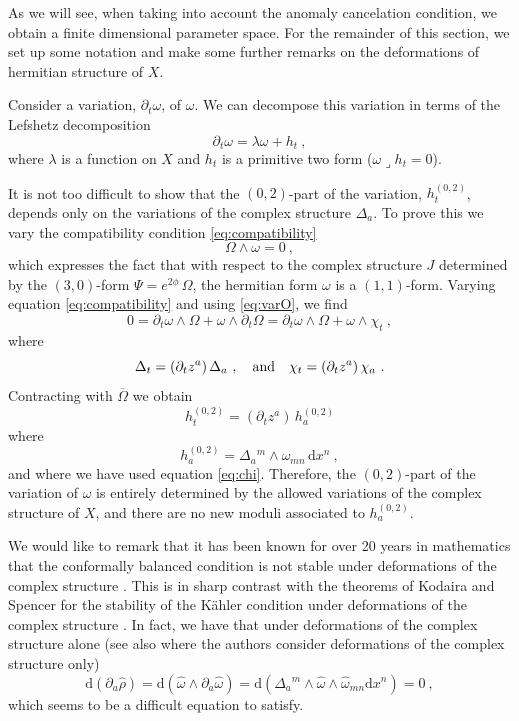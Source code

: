 \documentclass[12pt,a4paper]{article}
\def\bar#1{\overline{#1}}
\let\p=\partial
\def\d{\textrm{d}}
\theoremstyle{definition}
\begin{document}
As we will see,  when taking into account the anomaly cancelation condition, we obtain a finite dimensional parameter space. For the remainder of this section, we set up some notation and make some further remarks on the deformations of hermitian structure of $X$.

Consider a variation, $\p_t\omega$, of $\omega$.  We can decompose this variation in terms of the Lefshetz decomposition
\begin{equation}
 \p_t\omega = \lambda\omega + h_t~,\label{eq:varomega}
 \end{equation}
where $\lambda$ is a function on $X$ and $h_t$ is a primitive two form ($\omega\lrcorner h_t = 0$).

It is not too difficult to show that the $(0,2)$-part of the variation, $h_t^{(0,2)}$, depends only on the variations of the complex structure $\Delta_a$.  To prove this we vary the compatibility condition \eqref{eq:compatibility} 
\[ \Omega\wedge\omega = 0~,\]
which expresses the fact that with respect to the complex structure $J$ determined by the $(3,0)$-form $\Psi = e^{2\phi}\, \Omega$, the hermitian form $\omega$ is a $(1,1)$-form.  
Varying equation \eqref{eq:compatibility} and using \eqref{eq:varO}, we find
\[0= \partial_t\omega\wedge\Omega + \omega\wedge\partial_t\Omega = \partial_t\omega\wedge\Omega+ \omega\wedge\chi_t~,\]
where
\[ \Delta_t = (\partial_t z^a)\,\Delta_a~, 
\quad{\rm and}\quad \chi_t = (\partial_t z^a)\,\chi_a~.\]
Contracting with $\bar\Omega$ we obtain
\begin{equation*}
  h_t^{(0,2)} = (\partial_t z^a)\,h_a^{(0,2)}
 \end{equation*}
 where
 \begin{equation}
 h_a^{(0,2)} = \Delta_a{}^m\wedge \omega_{mn}\, \d x^n~,
 \label{eq:varpureomega}
 \end{equation}
and where we have used equation \eqref{eq:chi}.  Therefore, the $(0,2)$-part of the variation of $\omega$ is entirely  determined by 
the allowed variations of the complex structure of $X$, and there are no new moduli associated to $h_a^{(0,2)}$.


We would like to remark that it has been known for over 20 years in mathematics that the conformally balanced condition is not stable under deformations of the complex structure \citep{MR1107661, MR1137099, 0735.32009, 0793.53068}.  This is in sharp contrast with the theorems of Kodaira and Spencer for the stability of the K\"ahler condition under deformations of the complex structure \citep{MR0112154, 0128.16902}.
In fact, we have that under deformations of the complex structure alone (see also \citep{Becker:2005nb} where the authors consider deformations of the complex structure only)
\[\d(\p_a\hat\rho) = \d(\widehat\omega\wedge\p_a\widehat\omega) 
= \d(\Delta_a{}^m\wedge\widehat\omega\wedge \widehat\omega_{mn} \d x^n) = 0~,\]
which seems to be a difficult equation to satisfy.
\end{document}
